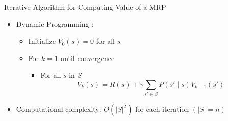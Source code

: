 \begin{frame}[c]{Iterative Algorithm for Computing Value of a MRP}

\begin{itemize}
	\item Dynamic Programming :
	\begin{itemize}
	\item Initialize $V_0(s) = 0$ for all $s$
	\item For $k=1$ until convergence
	\begin{itemize}
		\item For all $s$ in $S$
		$$V_k(s) = R(s) + \gamma \sum_{s' \in S} P(s' \mid s) V_{k-1}(s')$$
	\end{itemize}
	\end{itemize}

	\pause
	\smallskip
	\item Computational complexity: $O(|S|^2 )$ for each iteration $(|S| = n)$
\end{itemize}

\end{frame}



